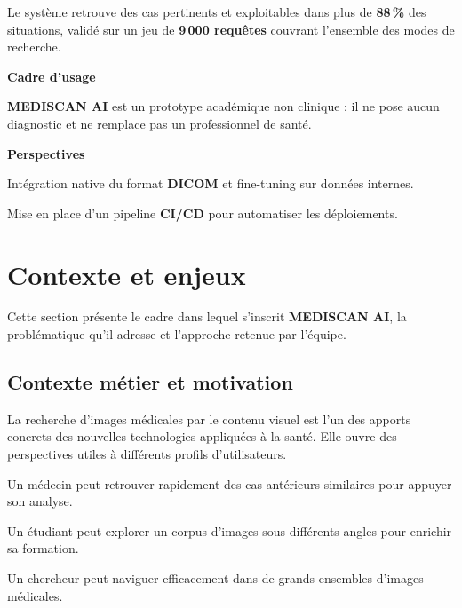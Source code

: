\documentclass[12pt,a4paper]{article}
\newcommand{\NewMajorPart}{\clearpage}
\begin{document}
\vspace{0.15cm}
Le système retrouve des cas pertinents et exploitables dans plus de \textbf{88\,\%} des situations,
validé sur un jeu de \textbf{9\,000 requêtes} couvrant l'ensemble des modes de recherche.

\vspace{0.6cm}
\textbf{Cadre d'usage}

\vspace{0.15cm}
\textbf{MEDISCAN AI} est un prototype académique non clinique : il ne pose aucun diagnostic
et ne remplace pas un professionnel de santé.

\vspace{0.6cm}
\textbf{Perspectives}

\vspace{0.15cm}
\begin{sq}
  \item Intégration native du format \textbf{DICOM} et fine-tuning sur données internes.
  \item Mise en place d'un pipeline \textbf{CI/CD} pour automatiser les déploiements.
\end{sq}
\NewMajorPart
\section{Contexte et enjeux}

\vspace{0.2cm}
Cette section présente le cadre dans lequel s'inscrit \textbf{MEDISCAN AI},
la problématique qu'il adresse et l'approche retenue par l'équipe.

\vspace{0.5cm}

\subsection{Contexte métier et motivation}

\vspace{0.2cm}
La recherche d'images médicales par le contenu visuel est l'un des apports concrets des nouvelles technologies
appliquées à la santé. Elle ouvre des perspectives utiles à différents profils d'utilisateurs.

\vspace{0.2cm}
\begin{sq}
  \item Un médecin peut retrouver rapidement des cas antérieurs similaires pour appuyer son analyse.
  \item Un étudiant peut explorer un corpus d'images sous différents angles pour enrichir sa formation.
  \item Un chercheur peut naviguer efficacement dans de grands ensembles d'images médicales.
\end{sq}
\end{document}
